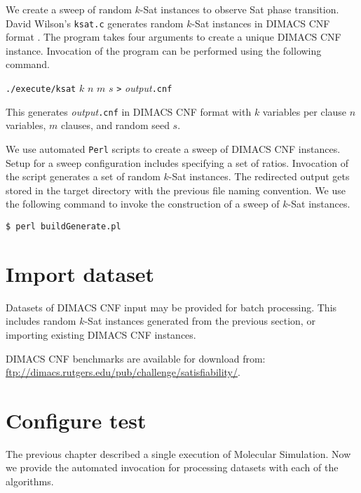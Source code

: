 
We create a sweep of random $k$-{\sc Sat} instances to observe {\sc Sat} phase transition.  David Wilson's \texttt{ksat.c} generates random $k$-{\sc Sat} instances in DIMACS CNF format \cite{wilsonKsat}.  The program takes four arguments to create a unique DIMACS CNF instance.  Invocation of the program can be performed using the following command.

\begin{center}
\texttt{./execute/ksat} $k$ $n$ $m$ $s$ \texttt{>} \textit{output}\texttt{.cnf}
\end{center}

This generates \textit{output}\texttt{.cnf} in DIMACS CNF format with $k$ variables per clause $n$ variables, $m$ clauses, and random seed $s$.

We use automated \texttt{Perl} scripts to create a sweep of DIMACS CNF instances.  Setup for a sweep configuration includes specifying a set of ratios.  Invocation of the script generates a set of random $k$-{\sc Sat} instances.  The redirected output gets stored in the target directory with the previous file naming convention.  We use the following command to invoke the construction of a sweep of $k$-{\sc Sat} instances.

\begin{center}
\texttt{\$ perl buildGenerate.pl}
\end{center}

	\section{Import dataset}


Datasets of DIMACS CNF input may be provided for batch processing.  This includes random $k$-{\sc Sat} instances generated from the previous section, or importing existing DIMACS CNF instances.   


DIMACS CNF benchmarks are available for download from: \url{ftp://dimacs.rutgers.edu/pub/challenge/satisfiability/}.

	\section{Configure test}
The previous chapter described a single execution of Molecular Simulation.  Now we provide the automated invocation for processing datasets with each of the algorithms.

